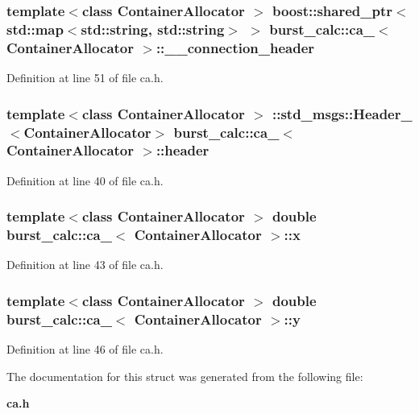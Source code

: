 \subsubsection[{\-\_\-\-\_\-connection\-\_\-header}]{\setlength{\rightskip}{0pt plus 5cm}template$<$class Container\-Allocator $>$ boost\-::shared\-\_\-ptr$<$std\-::map$<$std\-::string, std\-::string$>$ $>$ {\bf burst\-\_\-calc\-::ca\-\_\-}$<$ \-Container\-Allocator $>$\-::{\bf \-\_\-\-\_\-connection\-\_\-header}}\label{structburst__calc_1_1ca___aababa440d9b9bef9d035e4513b4a8dcc}


\-Definition at line 51 of file ca.\-h.

\subsubsection[{header}]{\setlength{\rightskip}{0pt plus 5cm}template$<$class Container\-Allocator $>$ \-::std\-\_\-msgs\-::\-Header\-\_\-$<$\-Container\-Allocator$>$ {\bf burst\-\_\-calc\-::ca\-\_\-}$<$ \-Container\-Allocator $>$\-::{\bf header}}\label{structburst__calc_1_1ca___a92ef083e41bcd25d9d03bb47fca23197}


\-Definition at line 40 of file ca.\-h.

\subsubsection[{x}]{\setlength{\rightskip}{0pt plus 5cm}template$<$class Container\-Allocator $>$ double {\bf burst\-\_\-calc\-::ca\-\_\-}$<$ \-Container\-Allocator $>$\-::{\bf x}}\label{structburst__calc_1_1ca___a798980c7ce8cd50e6de0b9fdd9f9bba0}


\-Definition at line 43 of file ca.\-h.

\subsubsection[{y}]{\setlength{\rightskip}{0pt plus 5cm}template$<$class Container\-Allocator $>$ double {\bf burst\-\_\-calc\-::ca\-\_\-}$<$ \-Container\-Allocator $>$\-::{\bf y}}\label{structburst__calc_1_1ca___ae8026519d63dde5e52faf01936b0a9a3}


\-Definition at line 46 of file ca.\-h.



\-The documentation for this struct was generated from the following file\-:\begin{DoxyCompactItemize}
\item 
{\bf ca.\-h}\end{DoxyCompactItemize}
